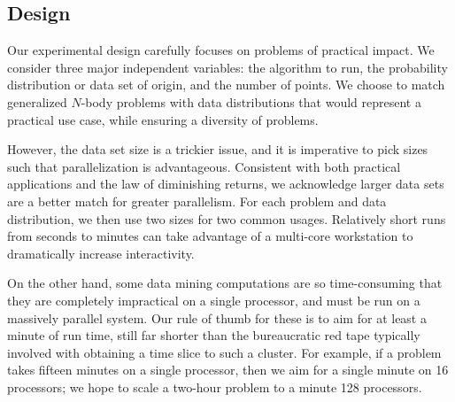 \documentclass[twoside,leqno,twocolumn]{article}
\begin{document}
\subsection{Design}


Our experimental design carefully focuses on problems of practical impact.
We consider three major independent variables: the algorithm to run, the probability distribution or data set of origin, and the number of points.
We choose to match generalized $N$-body problems with data distributions that would represent a practical use case, while ensuring a diversity of problems.

However, the data set size is a trickier issue, and it is imperative to pick sizes such that parallelization is advantageous.
Consistent with both practical applications and the law of diminishing returns, we acknowledge larger data sets are a better match for greater parallelism.
For each problem and data distribution, we then use two sizes for two common usages.
Relatively short runs from seconds to minutes can take advantage of a multi-core workstation to dramatically increase interactivity.

On the other hand, some data mining computations are so time-consuming that they are completely impractical on a single processor, and must be run on a massively parallel system.
Our rule of thumb for these is to aim for at least a minute of run time, still far shorter than the bureaucratic red tape typically involved with obtaining a time slice to such a cluster.
For example, if a problem takes fifteen minutes on a single processor, then we aim for a single minute on 16 processors; we hope to scale a two-hour problem to a minute 128 processors.

\end{document}
